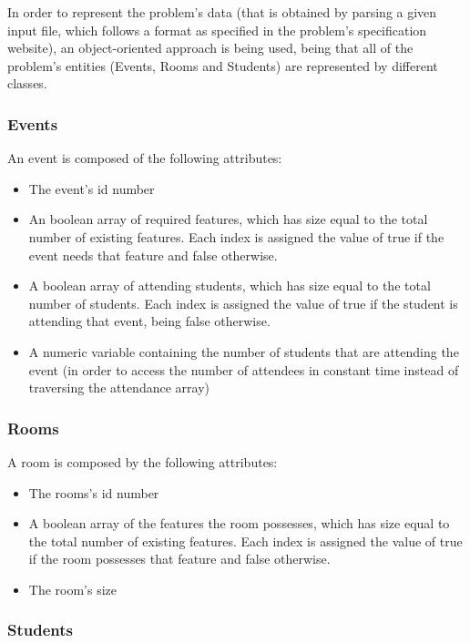 \documentclass[conference]{IEEEtran}
\begin{document}
In order to represent the problem's data (that is obtained by parsing a given input file, which follows a format as specified in the problem's specification website), an object-oriented approach is being used, being that all of the problem's entities (Events, Rooms and Students) are represented by different classes.

\subsubsection{Events}

An event is composed of the following attributes:
\begin{itemize}
    \item The event's id number
    \item An boolean array of required features, which has size equal to the total number of existing features. Each index is assigned the value of true if the event needs that feature and false otherwise.
    \item A boolean array of attending students, which has size equal to the total number of students. Each index is assigned the value of true if the student is attending that event, being false otherwise.
    \item A numeric variable containing the number of students that are attending the event (in order to access the number of attendees in constant time instead of traversing the attendance array)
\end{itemize}

\subsubsection{Rooms}

A room is composed by the following attributes:
\begin{itemize}
    \item The rooms's id number
    \item A boolean array of the features the room possesses, which has size equal to the total number of existing features. Each index is assigned the value of true if the room possesses that feature and false otherwise.
    \item The room's size
\end{itemize}

\subsubsection{Students}
\end{document}
